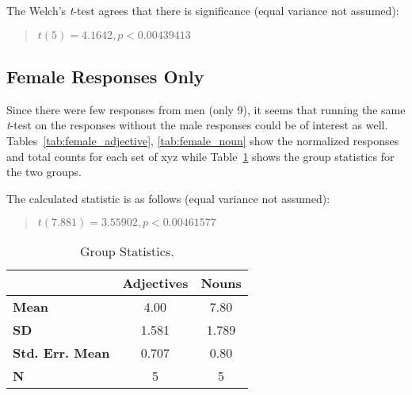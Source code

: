 The Welch's \textit{t}-test agrees that there is significance (equal variance not assumed):
	\begin{quote}
		$t(5)=4.1642, p < 0.00439413$
	\end{quote}


\subsection{Female Responses Only}
Since there were few responses from men (only 9), it seems that running the same \textit{t}-test on the responses without the male responses could be of interest as well.  Tables~\ref{tab:female_adjective}, \ref{tab:female_noun} show the normalized responses and total counts for each set of xyz while Table~\ref{tab:female_group_stats} shows the group statistics for the two groups.



%

The calculated statistic is as follows (equal variance not assumed):
	\begin{quote}
		$t(7.881)=3.55902, p < 0.00461577$ 
	\end{quote}


\begin{table}
	\begin{center}
		\begin{tabular}{|l|c|c|} \hline
									& \textbf{Adjectives} 	& \textbf{Nouns}  \\ \hline \hline
			\textbf{Mean} 			& 4.00					& 7.80	\\
			\textbf{SD} 			& 1.581					& 1.789	\\
			\textbf{Std. Err. Mean} & 0.707					& 0.80	\\
			\textbf{N} 				& 5						& 5		\\
			\hline
		\end{tabular}
	\end{center}
	\caption {Group Statistics.}
	\label{tab:female_group_stats}
\end{table}

